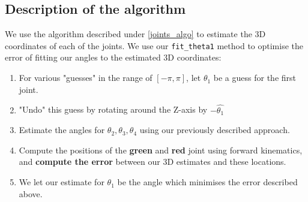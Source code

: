 
\subsection{Description of the algorithm}
We use the algorithm described under \ref{joints_algo} to estimate the
3D coordinates of each of the joints.
We use our \texttt{fit\_theta1} method to optimise the error of fitting
our angles to the estimated 3D coordinates:
\begin{enumerate}
    \item
        For various "guesses" in the range of $[-\pi, \pi]$, let
        $\hat{\theta_1}$ be a guess for the first joint.
    \item
        "Undo" this guess by rotating around the Z-axis by $-\hat{\theta_1}$
    \item
        Estimate the angles for $\theta_2, \theta_3, \theta_4$ using our
        previously described approach.
    \item
        Compute the positions of the \textbf{green} and \textbf{red}
        joint using forward kinematics, and \textbf{compute the error}
        between our 3D estimates and these locations.
    \item
        We let our estimate for $\theta_1$ be the angle which minimises
        the error described above.

\end{enumerate}

